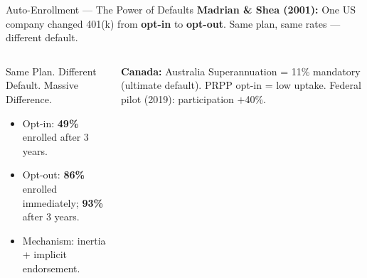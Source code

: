 \documentclass[aspectratio=169]{beamer}
\begin{document}
\begin{frame}{Auto-Enrollment --- The Power of Defaults}
\textcolor{beblue}{\textbf{Madrian \& Shea (2001):}} One US company changed 401(k) from \textbf{opt-in} to \textbf{opt-out}. Same plan, same rates --- different default.
\begin{columns}
\begin{block}{Same Plan. Different Default. Massive Difference.}
\begin{itemize}
  \item Opt-in: \textbf{49\%} enrolled after 3 years.
  \item Opt-out: \textbf{86\%} enrolled immediately; \textbf{93\%} after 3 years.
  \item Mechanism: inertia + implicit endorsement.
\end{itemize}
\end{block}
\textcolor{beteal}{\textbf{Canada:}} Australia Superannuation = 11\% mandatory (ultimate default). PRPP opt-in = low uptake. Federal pilot (2019): participation $+$40\%.
\end{columns}
\end{frame}
\end{document}
